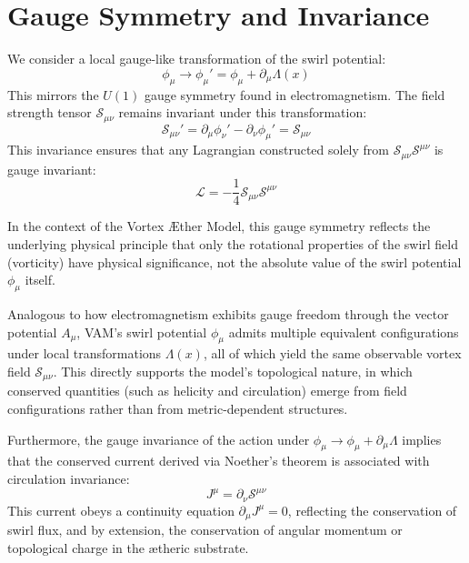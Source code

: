 \documentclass[a4paper,12pt]{article}
\begin{document}
    \section{Gauge Symmetry and Invariance}
        We consider a local gauge-like transformation of the swirl potential:
        \begin{equation}
            \phi_\mu \rightarrow \phi_\mu' = \phi_\mu + \partial_\mu \Lambda(x)
        \end{equation}
        This mirrors the $U(1)$ gauge symmetry found in electromagnetism. The field strength tensor $\mathcal{S}_{\mu\nu}$ remains invariant under this transformation:
        \begin{equation}
            \mathcal{S}_{\mu\nu}' = \partial_\mu \phi_\nu' - \partial_\nu \phi_\mu' = \mathcal{S}_{\mu\nu}
        \end{equation}
        This invariance ensures that any Lagrangian constructed solely from $\mathcal{S}_{\mu\nu} \mathcal{S}^{\mu\nu}$ is gauge invariant:
        \begin{equation}
            \mathcal{L} = -\frac{1}{4} \mathcal{S}_{\mu\nu} \mathcal{S}^{\mu\nu}
        \end{equation}

        In the context of the Vortex \AE{}ther Model, this gauge symmetry reflects the underlying physical principle that only the
        rotational properties of the swirl field (vorticity) have physical significance, not the absolute value of the swirl potential $\phi_\mu$ itself.

        Analogous to how electromagnetism exhibits gauge freedom through the vector potential $A_\mu$, VAM's swirl potential $\phi_\mu$ admits multiple equivalent configurations under local transformations $\Lambda(x)$, all of which yield the same observable vortex field $\mathcal{S}_{\mu\nu}$. This directly supports the model's topological nature, in which conserved quantities (such as helicity and circulation) emerge from field configurations rather than from metric-dependent structures.

        Furthermore, the gauge invariance of the action under $\phi_\mu \rightarrow \phi_\mu + \partial_\mu \Lambda$ implies that the conserved current derived via Noether's theorem is associated with circulation invariance:
        \begin{equation}
            J^\mu = \partial_\nu \mathcal{S}^{\mu\nu}
        \end{equation}
        This current obeys a continuity equation $\partial_\mu J^\mu = 0$, reflecting the conservation of swirl flux, and by extension, the conservation of angular momentum or topological charge in the ætheric substrate.
\end{document}
